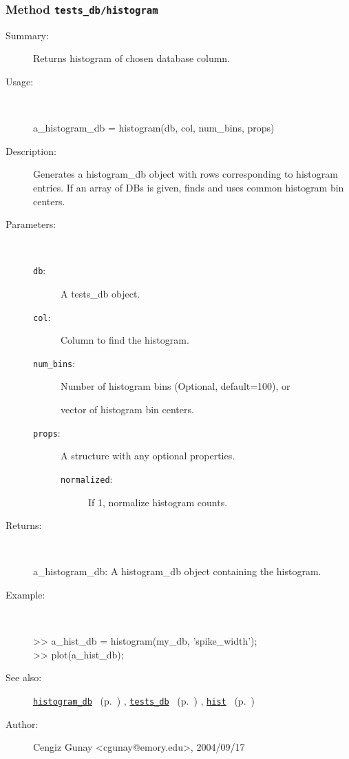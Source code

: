 \subsubsection[Method \texttt{histogram}]{Method \texttt{tests\_db/histogram}}%
%
\label{ref_tests_db__histogram}%
\hypertarget{ref_tests_db__histogram}{}%
\begin{description}
\item[Summary:]Returns histogram of chosen database column.
%
\item[Usage:]~%
\begin{lyxcode}%
a\_histogram\_db = histogram(db, col, num\_bins, props)
%
\end{lyxcode}%
%
\item[Description:]%
Generates a histogram\_db object with rows corresponding to histogram
 entries. If an array of DBs is given, finds and uses common histogram bin centers.
\item[Parameters:]~
\begin{description}%
\item[\texttt{db}:]
 A tests\_db object.
\item[\texttt{col}:]
 Column to find the histogram.
\item[\texttt{num\_bins}:]
 Number of histogram bins (Optional, default=100), or

vector of histogram bin centers.
\item[\texttt{props}:]
 A structure with any optional properties.
\begin{description}%
\item[\texttt{normalized}:]
 If 1, normalize histogram counts.
\end{description}%
\end{description}%
%
\item[Returns:
]~

	a\_histogram\_db: A histogram\_db object containing the histogram.
%
\item[Example:]~
\begin{lyxcode} >> a\_hist\_db = histogram(my\_db, 'spike\_width');
\\%
 >> plot(a\_hist\_db);
\\%
\end{lyxcode}
%
\item[See also:]%
\hyperlink{ref_histogram_db}{\texttt{histogram\_db}}%
\ (p.~\pageref{ref_histogram_db})%
%
, \hyperlink{ref_tests_db}{\texttt{tests\_db}}%
\ (p.~\pageref{ref_tests_db})%
%
, \hyperlink{ref_hist}{\texttt{hist}}%
\ (p.~\pageref{ref_hist})%
%
%
\item[Author:]%
Cengiz Gunay <cgunay@emory.edu>, 2004/09/17
%
\end{description}
\methodline%
